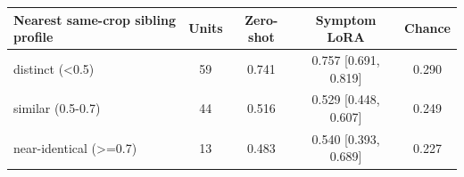 \begin{tabular}{lcccc}\toprule Nearest same-crop sibling profile & Units & Zero-shot & Symptom LoRA & Chance\\\midrule
distinct (<0.5) & 59 & 0.741 & 0.757 [0.691, 0.819] & 0.290\\
similar (0.5-0.7) & 44 & 0.516 & 0.529 [0.448, 0.607] & 0.249\\
near-identical (>=0.7) & 13 & 0.483 & 0.540 [0.393, 0.689] & 0.227\\
\bottomrule\end{tabular}
